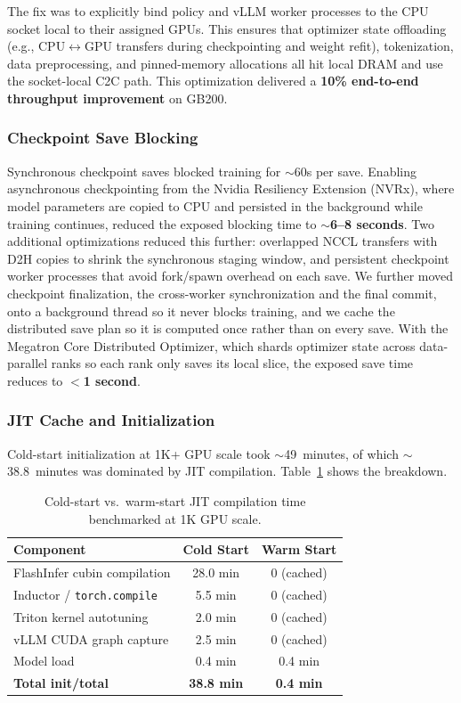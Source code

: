 The fix was to explicitly bind policy and vLLM worker processes to the CPU socket local to 
their assigned GPUs. This ensures that optimizer state offloading 
(e.g., CPU$\leftrightarrow$GPU transfers during checkpointing and weight refit), tokenization, 
data preprocessing, and pinned-memory allocations all hit local DRAM and use the 
socket-local C2C path. This optimization delivered a \textbf{10\% end-to-end throughput improvement} on GB200.

\subsubsection*{Checkpoint Save Blocking}
Synchronous checkpoint saves blocked training for $\sim$60s per save. Enabling asynchronous 
checkpointing from the Nvidia Resiliency Extension (NVRx), where model parameters are copied to CPU and persisted in the background 
while training continues, reduced the exposed blocking time to \textbf{$\sim$6--8 seconds}. 
Two additional optimizations reduced this further: overlapped NCCL transfers with D2H copies 
to shrink the synchronous staging window, and persistent checkpoint worker processes that avoid fork/spawn overhead on each save.  We further
moved checkpoint finalization, the cross-worker synchronization and the final
commit, onto a background thread so it never blocks training, and we cache the
distributed save plan so it is computed once rather than on every save. With the Megatron Core Distributed Optimizer, which shards optimizer state across 
data-parallel ranks so each rank only saves its local slice, the exposed save time reduces 
to \textbf{$<$1 second}.

\subsubsection*{JIT Cache and Initialization}

Cold-start initialization at 1K+ GPU scale took $\sim$49~minutes, of which $\sim$38.8~minutes 
was dominated by JIT compilation. Table~\ref{tab:jit-cache} shows the breakdown.

\begin{table}[ht!]
\centering
\caption{Cold-start vs.\ warm-start JIT compilation time benchmarked at 1K GPU scale.}
\label{tab:jit-cache}
\begin{tabular}{lcc}
\toprule
\textbf{Component} & \textbf{Cold Start} & \textbf{Warm Start} \\
\midrule
FlashInfer cubin compilation   & 28.0 min & 0 (cached) \\
Inductor / \texttt{torch.compile} & 5.5 min  & 0 (cached) \\
Triton kernel autotuning       & 2.0 min  & 0 (cached) \\
vLLM CUDA graph capture        & 2.5 min  & 0 (cached) \\
Model load                     & 0.4 min  & 0.4 min    \\
\midrule
\textbf{Total init/total}      & \textbf{38.8 min} & \textbf{0.4 min} \\
\bottomrule
\end{tabular}
\end{table}

